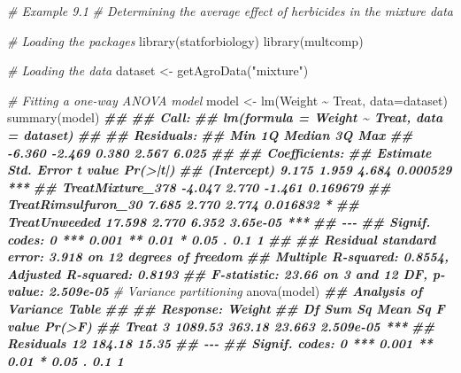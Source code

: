 \documentclass[
  12pt,
]{book}
\newenvironment{Shaded}{\begin{snugshade}}{\end{snugshade}}
\newcommand{\AttributeTok}[1]{\textcolor[rgb]{0.77,0.63,0.00}{#1}}
\newcommand{\CommentTok}[1]{\textcolor[rgb]{0.56,0.35,0.01}{\textit{#1}}}
\newcommand{\DocumentationTok}[1]{\textcolor[rgb]{0.56,0.35,0.01}{\textbf{\textit{#1}}}}
\newcommand{\FunctionTok}[1]{\textcolor[rgb]{0.00,0.00,0.00}{#1}}
\newcommand{\NormalTok}[1]{#1}
\newcommand{\OtherTok}[1]{\textcolor[rgb]{0.56,0.35,0.01}{#1}}
\newcommand{\SpecialCharTok}[1]{\textcolor[rgb]{0.00,0.00,0.00}{#1}}
\newcommand{\StringTok}[1]{\textcolor[rgb]{0.31,0.60,0.02}{#1}}
\begin{document}
\begin{Shaded}
\begin{Highlighting}[]
\CommentTok{\# Example 9.1}
\CommentTok{\# Determining the average effect of herbicides in the \textquotesingle{}mixture\textquotesingle{} data}

\CommentTok{\# Loading the packages}
\FunctionTok{library}\NormalTok{(statforbiology)}
\FunctionTok{library}\NormalTok{(multcomp)}

\CommentTok{\# Loading the data}
\NormalTok{dataset }\OtherTok{\textless{}{-}} \FunctionTok{getAgroData}\NormalTok{(}\StringTok{"mixture"}\NormalTok{)}

\CommentTok{\# Fitting a one{-}way ANOVA model}
\NormalTok{model }\OtherTok{\textless{}{-}} \FunctionTok{lm}\NormalTok{(Weight }\SpecialCharTok{\textasciitilde{}}\NormalTok{ Treat, }\AttributeTok{data=}\NormalTok{dataset)}
\FunctionTok{summary}\NormalTok{(model)}
\DocumentationTok{\#\# }
\DocumentationTok{\#\# Call:}
\DocumentationTok{\#\# lm(formula = Weight \textasciitilde{} Treat, data = dataset)}
\DocumentationTok{\#\# }
\DocumentationTok{\#\# Residuals:}
\DocumentationTok{\#\#    Min     1Q Median     3Q    Max }
\DocumentationTok{\#\# {-}6.360 {-}2.469  0.380  2.567  6.025 }
\DocumentationTok{\#\# }
\DocumentationTok{\#\# Coefficients:}
\DocumentationTok{\#\#                     Estimate Std. Error t value Pr(\textgreater{}|t|)    }
\DocumentationTok{\#\# (Intercept)            9.175      1.959   4.684 0.000529 ***}
\DocumentationTok{\#\# TreatMixture\_378      {-}4.047      2.770  {-}1.461 0.169679    }
\DocumentationTok{\#\# TreatRimsulfuron\_30    7.685      2.770   2.774 0.016832 *  }
\DocumentationTok{\#\# TreatUnweeded         17.598      2.770   6.352 3.65e{-}05 ***}
\DocumentationTok{\#\# {-}{-}{-}}
\DocumentationTok{\#\# Signif. codes:  0 \textquotesingle{}***\textquotesingle{} 0.001 \textquotesingle{}**\textquotesingle{} 0.01 \textquotesingle{}*\textquotesingle{} 0.05 \textquotesingle{}.\textquotesingle{} 0.1 \textquotesingle{} \textquotesingle{} 1}
\DocumentationTok{\#\# }
\DocumentationTok{\#\# Residual standard error: 3.918 on 12 degrees of freedom}
\DocumentationTok{\#\# Multiple R{-}squared:  0.8554, Adjusted R{-}squared:  0.8193 }
\DocumentationTok{\#\# F{-}statistic: 23.66 on 3 and 12 DF,  p{-}value: 2.509e{-}05}
\CommentTok{\# Variance partitioning}
\FunctionTok{anova}\NormalTok{(model)}
\DocumentationTok{\#\# Analysis of Variance Table}
\DocumentationTok{\#\# }
\DocumentationTok{\#\# Response: Weight}
\DocumentationTok{\#\#           Df  Sum Sq Mean Sq F value    Pr(\textgreater{}F)    }
\DocumentationTok{\#\# Treat      3 1089.53  363.18  23.663 2.509e{-}05 ***}
\DocumentationTok{\#\# Residuals 12  184.18   15.35                      }
\DocumentationTok{\#\# {-}{-}{-}}
\DocumentationTok{\#\# Signif. codes:  0 \textquotesingle{}***\textquotesingle{} 0.001 \textquotesingle{}**\textquotesingle{} 0.01 \textquotesingle{}*\textquotesingle{} 0.05 \textquotesingle{}.\textquotesingle{} 0.1 \textquotesingle{} \textquotesingle{} 1}
\end{Highlighting}
\end{Shaded}
\end{document}
